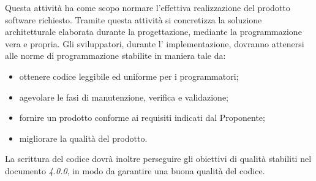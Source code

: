     Questa attività ha come scopo normare l'effettiva realizzazione del prodotto software richiesto. Tramite questa attività si concretizza la soluzione architetturale elaborata durante la progettazione, mediante la programmazione vera e propria.
    Gli sviluppatori, durante l' implementazione, dovranno attenersi alle norme di programmazione stabilite in maniera tale da:
    \begin{itemize}
       	\item ottenere codice leggibile ed uniforme per i programmatori;
       	\item agevolare le fasi di manutenzione, verifica e validazione;
       	\item fornire un prodotto conforme ai requisiti indicati dal Proponente;
       	\item migliorare la qualità del prodotto.
   	\end{itemize}

   	\noindent La scrittura del codice dovrà inoltre perseguire gli obiettivi di qualità stabiliti nel documento \textit{\PdQ{} 4.0.0}, in modo da garantire una buona qualità del codice.
